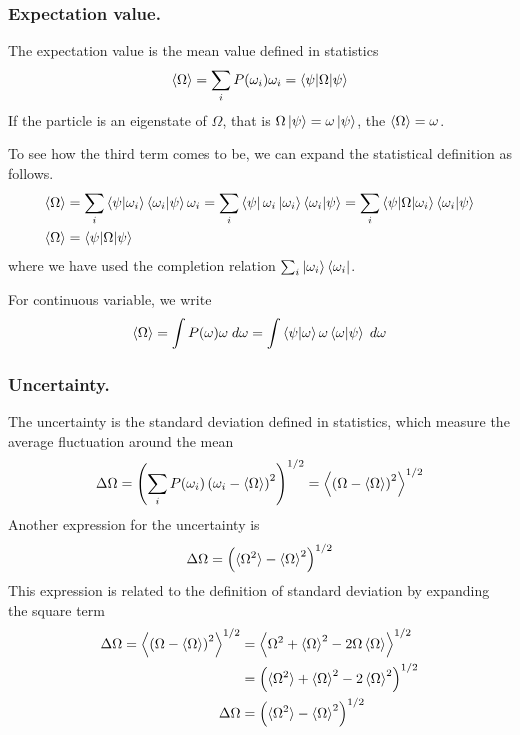 \documentclass[../../../main.tex]{subfiles}
\begin{document}
\subsubsection{Expectation value.}
The expectation value is the mean value defined in statistics
\begin{equation*}
    \braket{\Omega}=\sum_i P(\omega_i)\omega_i=\braket{\psi|\Omega|\psi}
\end{equation*}
If the particle is an eigenstate of $\Omega$, that is $\Omega \ket{\psi}=\omega \ket{\psi}$, the $\braket{\Omega}=\omega$.

To see how the third term comes to be, we can expand the statistical definition as follows.
\begin{align*}
    \braket{\Omega }&= \sum_i \braket{\psi|\omega_i }\braket{\omega_i|\psi}\omega_i =\sum_i \bra{\psi}\omega_i \ket{\omega_i }\braket{\omega_i|\psi}=\sum_i \braket{\psi|\Omega|\omega_i}\braket{\omega_i|\psi}\\
    \braket{\Omega}&= \braket{\psi|\Omega|\psi} 
\end{align*}
where we have used the completion relation $\sum_i \ket{\omega_i}\bra{\omega_i }$.

For continuous variable, we write 
\begin{equation*}
    \braket{\Omega}=\int P(\omega)\omega\;d \omega=\int \braket{\psi|\omega}\omega \braket{\omega|\psi}\; d\omega
\end{equation*}

\subsubsection{Uncertainty.}
The uncertainty is the standard deviation defined in statistics, which measure the average fluctuation around the mean 
\begin{equation*}
    \Delta\Omega=\left(\sum_i P(\omega_i)\left( \omega_i -\braket{\Omega} \right)^2 \right)^{1/2}=\left\langle \left( \Omega-\braket{\Omega} \right)^2 \right\rangle  ^{1/2}
\end{equation*}
Another expression for the uncertainty is 
\begin{equation*}
    \Delta\Omega=\left( \braket{\Omega^2}-\braket{\Omega}^2 \right) ^{1/2}
\end{equation*}
This expression is related to the definition of standard deviation by expanding the square term 
\begin{align*}
    \Delta\Omega=\left\langle \left( \Omega-\braket{\Omega} \right)^2 \right\rangle  ^{1/2} &= \left\langle \Omega^2+\braket{\Omega}^2-2\Omega \braket{\Omega } \right\rangle^{1/2}\\
    &= \left( \braket{\Omega^2}+\braket{\Omega}^2-2 \braket{\Omega}^2 \right) ^{1/2}\\
    \Delta\Omega &= \left( \braket{\Omega^2}-\braket{\Omega}^2 \right) ^{1/2}
\end{align*} 
\end{document}
